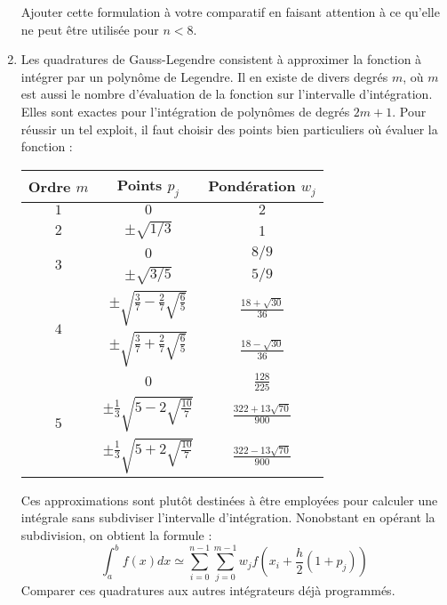 \begin{enumerate}
Ajouter cette formulation à votre  comparatif en faisant attention à
ce qu'elle ne peut être utilisée pour $n<8$.
\item  Les quadratures  de Gauss-Legendre  consistent à  approximer la
  fonction à  intégrer par un  polynôme de  Legendre. Il en  existe de
  divers degrés  $m$, où $m$  est aussi  le nombre d'évaluation  de la
  fonction sur  l'intervalle d'intégration.   Elles sont  exactes pour
  l'intégration de  polynômes de  degrés $2m+1$.  Pour réussir  un tel
  exploit, il faut choisir des  points bien particuliers où évaluer la
  fonction :
\begin{center}
\begin{tabular}{ccc}
Ordre $m$& Points $p_j$  &Pondération $w_j$\\ \hline\hline \strut$1$ &
$0$  &  $2$   \\\hline  \strut$2$  &  $\pm   \sqrt{1/3}$  &  1\\\hline
\multirow{2}{*}{$3$} & $0$ & $8/9$\\ & $\pm\sqrt{3/5}$ & $5/9$\\\hline
\multirow{2}{*}{$4$}                                                 &
$\pm\sqrt{\frac{3}{7}-\frac{2}{7}\sqrt{\frac{6}{5}}}$                &
$\frac{18+\sqrt{30}}{36}$\\                                          &
$\pm\sqrt{\frac{3}{7}+\frac{2}{7}\sqrt{\frac{6}{5}}}$                &
$\frac{18-\sqrt{30}}{36}$\\\hline   \multirow{3}{*}{$5$}   &   $0$   &
$\frac{128}{225}$\\ &  $\pm\frac{1}{3}\sqrt{5-2\sqrt{\frac{10}{7}}}$ &
$\frac{322+13\sqrt{70}}{900}$\\                                      &
$\pm\frac{1}{3}\sqrt{5+2\sqrt{\frac{10}{7}}}$                        &
$\frac{322-13\sqrt{70}}{900}$\\

\end{tabular}
\end{center}
Ces  approximations  sont  plutôt  destinées  à  être  employées  pour
calculer     une     intégrale    sans     subdiviser     l'intervalle
d'intégration.  Nonobstant en  opérant  la subdivision,  on obtient  la
formule :
\begin{equation}
\int_a^b   f(x)dx   \simeq   \sum_{i=0}^{n-1}   \sum_{j=0}^{m-1}   w_j
f(x_i+\frac{h}{2}(1+p_j))
\end{equation}
Comparer  ces  quadratures  aux autres  intégrateurs  déjà  programmés.\\

 



\end{enumerate}
